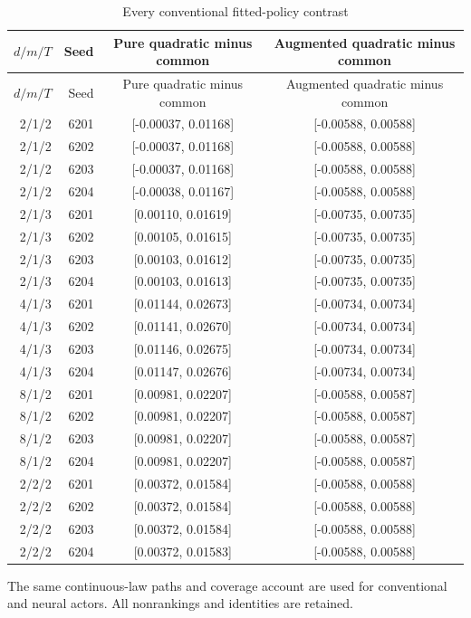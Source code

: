 {\small\setlength{\tabcolsep}{3pt}
\begin{longtable}{rrcc}
\caption{Every conventional fitted-policy contrast}\label{tab:quadratic-cost62} \\
\hline
$d/m/T$ & Seed & Pure quadratic minus common & Augmented quadratic minus common \\
\hline\endfirsthead
\hline
$d/m/T$ & Seed & Pure quadratic minus common & Augmented quadratic minus common \\
\hline\endhead
2/1/2 & 6201 & [-0.00037, 0.01168] & [-0.00588, 0.00588] \\
2/1/2 & 6202 & [-0.00037, 0.01168] & [-0.00588, 0.00588] \\
2/1/2 & 6203 & [-0.00037, 0.01168] & [-0.00588, 0.00588] \\
2/1/2 & 6204 & [-0.00038, 0.01167] & [-0.00588, 0.00588] \\
2/1/3 & 6201 & [0.00110, 0.01619] & [-0.00735, 0.00735] \\
2/1/3 & 6202 & [0.00105, 0.01615] & [-0.00735, 0.00735] \\
2/1/3 & 6203 & [0.00103, 0.01612] & [-0.00735, 0.00735] \\
2/1/3 & 6204 & [0.00103, 0.01613] & [-0.00735, 0.00735] \\
4/1/3 & 6201 & [0.01144, 0.02673] & [-0.00734, 0.00734] \\
4/1/3 & 6202 & [0.01141, 0.02670] & [-0.00734, 0.00734] \\
4/1/3 & 6203 & [0.01146, 0.02675] & [-0.00734, 0.00734] \\
4/1/3 & 6204 & [0.01147, 0.02676] & [-0.00734, 0.00734] \\
8/1/2 & 6201 & [0.00981, 0.02207] & [-0.00588, 0.00587] \\
8/1/2 & 6202 & [0.00981, 0.02207] & [-0.00588, 0.00587] \\
8/1/2 & 6203 & [0.00981, 0.02207] & [-0.00588, 0.00587] \\
8/1/2 & 6204 & [0.00981, 0.02207] & [-0.00588, 0.00587] \\
2/2/2 & 6201 & [0.00372, 0.01584] & [-0.00588, 0.00588] \\
2/2/2 & 6202 & [0.00372, 0.01584] & [-0.00588, 0.00588] \\
2/2/2 & 6203 & [0.00372, 0.01584] & [-0.00588, 0.00588] \\
2/2/2 & 6204 & [0.00372, 0.01583] & [-0.00588, 0.00588] \\
\hline
\end{longtable}}
{\footnotesize The same continuous-law paths and coverage account are used for conventional and neural actors. All nonrankings and identities are retained.}
